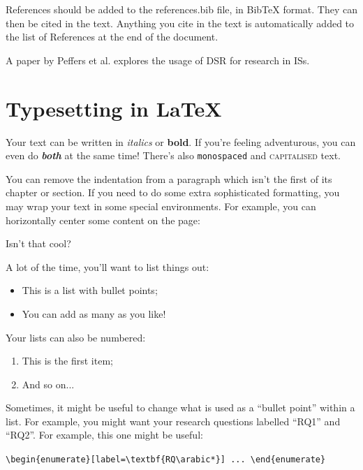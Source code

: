 \documentclass[12pt,reqno,twoside]{amsbook}
\begin{document}
References should be added to the references.bib file, in BibTeX format. They can then be cited in the text. Anything you cite in the text is automatically added to the list of References at the end of the document.

A paper by Peffers et al. \cite{Peffers2007} explores the usage of \ac{DSR} for research in \acp{IS}.










\chapter{Typesetting in \LaTeX}\label{ch:typesetting}

Your text can be written in \textit{italics} or \textbf{bold}. If you're feeling adventurous, you can even do \textit{\textbf{both}} at the same time! There's also \texttt{monospaced} and \textsc{capitalised} text.

\noindent You can remove the indentation from a paragraph which isn't the first of its chapter or section. If you need to do some extra sophisticated formatting, you may wrap your text in some special environments. For example, you can horizontally center some content on the page:
\begin{center}
    Isn't that cool?
\end{center}

\noindent A lot of the time, you'll want to list things out:
\begin{itemize}
    \item This is a list with bullet points;
    \item You can add as many as you like!
\end{itemize}

\noindent Your lists can also be numbered:
\begin{enumerate}
    \item This is the first item;
    \item And so on...
\end{enumerate}

\noindent Sometimes, it might be useful to change what is used as a ``bullet point'' within a list. For example, you might want your research questions labelled ``RQ1'' and ``RQ2''. For example, this one might be useful:

\begin{center}
    \verb|\begin{enumerate}[label=\textbf{RQ\arabic*}] ... \end{enumerate}|
\end{center}
\end{document}
